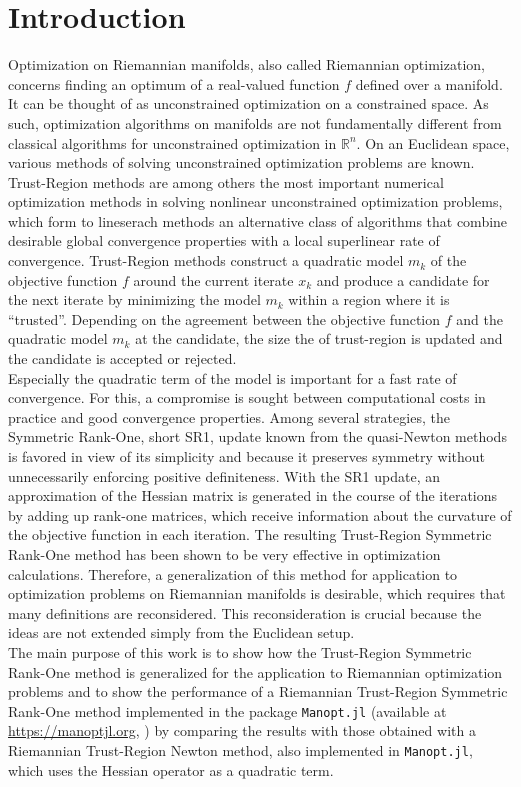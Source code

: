 \chapter{Introduction}

Optimization on Riemannian manifolds, also called Riemannian optimization, concerns finding an optimum of a real-valued function $f$ defined over a manifold. It can be thought of as unconstrained optimization on a constrained space. As such, optimization algorithms on manifolds are not fundamentally different from classical algorithms for unconstrained optimization in $\mathbb{R}^n$. On an Euclidean space, various methods of solving unconstrained optimization problems are known. \\
Trust-Region methods are among others the most important numerical optimization methods in solving nonlinear unconstrained optimization problems, which form to lineserach methods an alternative class of algorithms that combine desirable global convergence properties with a local superlinear rate of convergence. Trust-Region methods construct a quadratic model $m_k$ of the objective function $f$ around the current iterate $x_k$ and produce a candidate for the next iterate by minimizing the model $m_k$ within a region where it is “trusted”. Depending on the agreement between the objective function $f$ and the quadratic model $m_k$ at the candidate, the size the of trust-region is updated and the candidate is accepted or rejected. \\
Especially the quadratic term of the model is important for a fast rate of convergence. For this, a compromise is sought between computational costs in practice and good convergence properties. Among several strategies, the Symmetric Rank-One, short SR1, update known from the quasi-Newton methods is favored in view of its simplicity and because it preserves symmetry without unnecessarily enforcing positive definiteness. With the SR1 update, an approximation of the Hessian matrix is generated in the course of the iterations by adding up rank-one matrices, which receive information about the curvature of the objective function in each iteration. The resulting Trust-Region Symmetric Rank-One method has been shown to be very effective in optimization calculations. Therefore, a generalization of this method for application to optimization problems on Riemannian manifolds is desirable, which requires that many definitions are reconsidered. This reconsideration is crucial because the ideas are not extended simply from the Euclidean setup. \\
The main purpose of this work is to show how the Trust-Region Symmetric Rank-One method is generalized for the application to Riemannian optimization problems and to show the performance of a Riemannian Trust-Region Symmetric Rank-One method implemented in the package \lstinline!Manopt.jl! (available at \url{https://manoptjl.org}, \cite{Bergmann:2019}) by comparing the results with those obtained with a Riemannian Trust-Region Newton method, also implemented in \lstinline!Manopt.jl!, which uses the Hessian operator as a quadratic term. 

